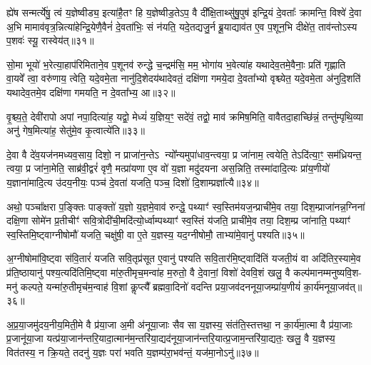 ह्ये॑ष सन्मर्त्ये॑षु॒ त्वं य॒ज्ञेष्वीड्य॒ इत्या॑है॒तꣳ हि य॒ज्ञेष्वीड॒ते\-ऽप॒ वै दी᳚क्षि॒ताथ्सु॑षु॒पुष॑ इन्द्रि॒यं दे॒वताः᳚ क्रामन्ति॒ विश्वे॑ दे॒वा अ॒भि मामाव॑वृत्र॒न्नित्या॑हेन्द्रि॒येणै॒वैनं॑ दे॒वता॑भिः॒ सं न॑यति॒ यदे॒तद्यजु॒र्न ब्रू॒याद्याव॑त ए॒व प॒शून॒भि दीक्षे॑त॒ ताव॑न्तो\-ऽस्य प॒शवः॑ स्यू॒ रास्वेय॑त्॥३१॥

सो॒मा भूयो॑ भ॒रेत्या॒हाप॑रिमिताने॒व प॒शूनव॑ रुन्द्धे च॒न्द्रम॑सि॒ मम॒ भोगा॑य भ॒वेत्या॑ह यथादेव॒तमे॒वैनाः॒ प्रति॑ गृह्णाति वा॒यवे᳚ त्वा॒ वरु॑णाय॒ त्वेति॒ यदे॒वमे॒ता नानु॑दि॒शेदय॑थादेवतं॒ दक्षि॑णा गमये॒दा दे॒वता᳚भ्यो वृश्च्येत॒ यदे॒वमे॒ता अ॑नुदि॒शति॑ यथादेव॒तमे॒व दक्षि॑णा गमयति॒ न दे॒वता᳚भ्य॒ आ॥३२॥

वृ॒श्च्य॒ते॒ देवी॑रापो अपां नपा॒दित्या॑ह॒ यद्वो॒ मेध्यं॑ य॒ज्ञिय॒ꣳ॒ सदे॑वं॒ तद्वो॒ माव॑ क्रमिष॒मिति॒ वावैतदा॒हाच्छि॑न्नं॒ तन्तु॑म्पृथि॒व्या अनु॑ गेष॒मित्या॑ह॒ सेतु॑मे॒व कृ॒त्वात्ये॑ति॥३३॥

{}

दे॒वा वै दे॑व॒यज॑नमध्यव॒साय॒ दिशो॒ न प्राजा॑न॒न्ते\-ऽ न्यो᳚न्यमुपा॑धाव॒न्त्वया॒ प्र जा॑नाम॒ त्वयेति॒ ते\-ऽदि॑त्या॒ꣳ॒ सम॑ध्रियन्त॒ त्वया॒ प्र जा॑ना॒मेति॒ साब्र॑वी॒द्वरं॑ वृणै॒ मत्प्रा॑यणा ए॒व वो॑ य॒ज्ञा मदु॑दयना अस॒न्निति॒ तस्मा॑दादि॒त्यः प्रा॑य॒णीयो॑ य॒ज्ञाना॑मादि॒त्य उ॑दय॒नीयः॒ पञ्च॑ दे॒वता॑ यजति॒ पञ्च॒ दिशो॑ दि॒शाम्प्रज्ञा᳚त्यै॥३४॥

अथो॒ पञ्चा᳚क्षरा प॒ङ्क्तिः पाङ्क्तो॑ य॒ज्ञो य॒ज्ञमे॒वाव॑ रुन्द्धे॒ पथ्याꣳ॑ स्व॒स्तिम॑यज॒न्प्राची॑मे॒व तया॒ दिश॒म्प्राजा॑नन्न॒ग्निना॑ दक्षि॒णा सोमे॑न प्र॒तीचीꣳ॑ सवि॒त्रोदी॑ची॒मदि॑त्यो॒र्ध्वाम्पथ्याꣳ॑ स्व॒स्तिं य॑जति॒ प्राची॑मे॒व तया॒ दिश॒म्प्र जा॑नाति॒ पथ्याꣳ॑ स्व॒स्तिमि॒ष्ट्वाग्नीषोमौ॑ यजति॒ चक्षु॑षी॒ वा ए॒ते य॒ज्ञस्य॒ यद॒ग्नीषोमौ॒ ताभ्या॑मे॒वानु॑ पश्यति॥३५॥

अ॒ग्नीषोमा॑वि॒ष्ट्वा स॑वि॒तारं॑ यजति सवि॒तृप्र॑सूत ए॒वानु॑ पश्यति सवि॒तार॑मि॒ष्ट्वादि॑तिं यजती॒यं वा अदि॑तिर॒स्यामे॒व प्र॑ति॒ष्ठायानु॑ पश्य॒त्यदि॑तिमि॒ष्ट्वा मा॑रु॒तीमृच॒मन्वा॑ह म॒रुतो॒ वै दे॒वानां॒ विशो॑ देववि॒शं खलु॒ वै कल्प॑मानम्मनुष्यवि॒श- मनु॑ कल्पते॒ यन्मा॑रु॒तीमृच॑म॒न्वाह॑ वि॒शां कॢप्त्यै᳚ ब्रह्मवा॒दिनो॑ वदन्ति प्रया॒जव॑दननूया॒जम्प्रा॑य॒णीयं॑ का॒र्य॑मनूया॒जव॑त्॥३६॥

अ॒प्र॒या॒जमु॑दय॒नीय॒मिती॒मे वै प्र॑या॒जा अ॒मी अ॑नूया॒जाः सैव सा य॒ज्ञस्य॒ संत॑ति॒स्तत्तथा॒ न का॒र्य॑मा॒त्मा वै प्र॑या॒जाः प्र॒जानू॑या॒जा यत्प्र॑या॒जान॑न्तरि॒यादा॒त्मान॑म॒न्तरि॑या॒द्यद॑नूया॒जान॑न्तरि॒यात्प्र॒जाम॒न्तरि॑या॒द्यतः॒ खलु॒ वै य॒ज्ञस्य॒ वित॑तस्य॒ न क्रि॒यते॒ तदनु॑ य॒ज्ञः परा॑ भवति य॒ज्ञम्प॑रा॒भव॑न्तं॒ यज॑मा॒नो\-ऽनु॑॥३७॥


